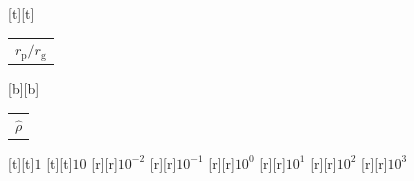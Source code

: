 %    
%
%
\begin{psfrags}%
\psfragscanon%
%
[t][t]{\color[rgb]{0,0,0}\setlength{\tabcolsep}{0pt}\begin{tabular}{c}{\Large$r_\mathrm{p}/r_\mathrm{g}$}\end{tabular}}%
[b][b]{\color[rgb]{0,0,0}\setlength{\tabcolsep}{0pt}\begin{tabular}{c}{\Large$\hat{\rho}$}\end{tabular}}%
%
[t][t]{$1$}%
[t][t]{$10$}%
%
[r][r]{$10^{-2}$}%
[r][r]{$10^{-1}$}%
[r][r]{$10^{0}$}%
[r][r]{$10^{1}$}%
[r][r]{$10^{2}$}%
[r][r]{$10^{3}$}%
%
%
\end{psfrags}%
%
